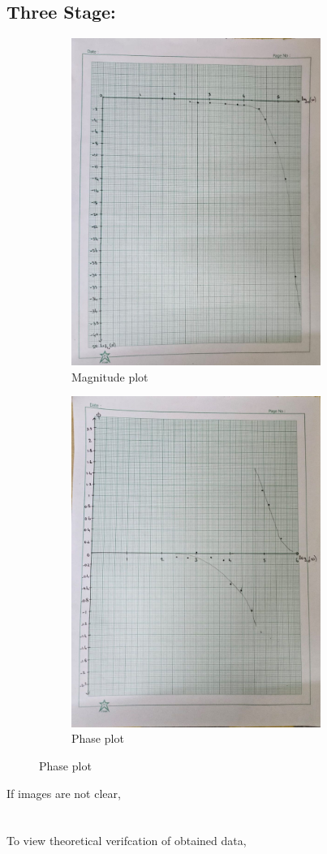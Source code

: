 \documentclass[a4paper,12pt]{article}
\begin{document}
\subsection{Three Stage:}
\pagebreak
\begin{figure}[h!]
	\begin{subfigure}[b]{100pt}
		\caption{Magnitude plot}
		\includegraphics[width = 230pt]{figs/fig5.png}
	\end{subfigure}
	\hspace{110pt}
	\begin{subfigure}[b]{100pt}
		\caption{Phase plot}
		\includegraphics[width = 230pt]{figs/fig6.png}
	\end{subfigure}
\end{figure}
If images are not clear,\\
\\\\
To view theoretical verifcation of obtained data,\\
\end{document}
